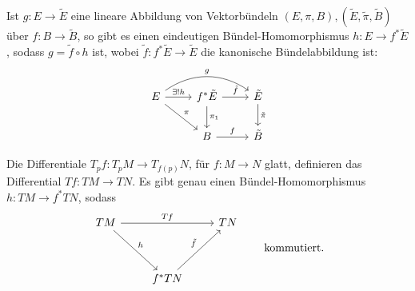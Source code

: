 \begin{lem}
	Ist $ g: E \to \tilde{E} $ eine lineare Abbildung von Vektorbündeln $(E,\pi,B), (\tilde{E}, \tilde{\pi},\tilde{B})$ über $f: B \to \tilde{B}$, so gibt es einen eindeutigen Bündel-Homomorphismus $h: E \to f^*\tilde{E}$, sodass $g = \tilde{f} \circ h$ ist, wobei $ \tilde{f}: f^*\tilde{E} \to \tilde{E} $ die kanonische Bündelabbildung ist:
	\[ \begin{tikzcd}
		E \arrow{r}{\exists !h} \arrow{dr}{\pi} \arrow[bend left=35]{rr}{g} & f^*\tilde{E} \arrow{r}{\tilde{f}} \arrow{d}{\pi_1} & \tilde{E} \arrow{d}{\tilde{\pi}} \\
			& B\arrow{r}{f} & \tilde{B}
		\end{tikzcd} \]
\end{lem}

\begin{exmp*}
	Die Differentiale $ T_pf: T_pM \to T_{f(p)}N $, für $f:M \to N$ glatt, definieren das Differential $Tf: TM \to TN$. Es gibt genau einen Bündel-Homomorphismus $h: TM \to f^*TN$, sodass
	\[ \begin{tikzcd}
		TM \arrow{rr}{Tf} \arrow{ddr}{h}&&TN\\
		\\
		& f^*TN \arrow{uur}{\tilde{f}}
	\end{tikzcd} \qquad \text{kommutiert.} \]
\end{exmp*}